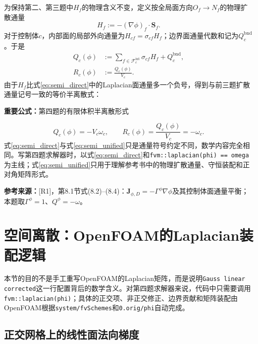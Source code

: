 \documentclass[UTF8,12pt,a4paper]{ctexart}
\numberwithin{equation}{section}
\newcommand{\Rone}{\textnormal{[R1]}}
\newcommand{\source}[1]{%
  \par\smallskip
  \noindent\colorbox{sourcebg}{%
    \parbox{0.955\linewidth}{\footnotesize\color{sourcegray}\textbf{参考来源：}#1}%
  }
  \par\smallskip
}
\newcommand{\keytitle}[1]{%
  \par\smallskip\noindent
  \colorbox{keybg}{\parbox{0.965\linewidth}{\color{keyblue}\textbf{重要公式：}#1}}
  \par\smallskip
}
\begin{document}
为保持第二、第三题中$H_f$的物理含义不变，定义按全局面方向$O_f\to N_f$的物理扩散通量
\begin{equation}
  \boxed{
  H_f:=-\left(\nabla\phi\right)_f\cdot\bm S_f.}
  \label{eq:H_definition}
\end{equation}
对于控制体$c$，内部面的局部外向通量为$H_{cf}=\sigma_{cf}H_f$；边界面通量代数和记为$Q_c^{\mathrm{bnd}}$。于是
\begin{align}
  Q_c(\phi)
  &:=%
  \sum_{f\in\mathcal F_c^{\mathrm{int}}}
  \sigma_{cf}H_f+Q_c^{\mathrm{bnd}},
  \label{eq:Q_definition}\\
  R_c(\phi)
  &:=\frac{Q_c(\phi)}{V_c}.
  \label{eq:R_definition}
\end{align}
由于$H_f$比式\eqref{eq:semi_direct}中的Laplacian面通量多一个负号，得到与前三题扩散通量记号一致的等价半离散式：
\keytitle{第四题的有限体积半离散形式}
\begin{equation}
  \boxed{
  Q_c(\phi)=-V_c\omega_c,
  \qquad
  R_c(\phi)=\frac{Q_c(\phi)}{V_c}=-\omega_c.}
  \label{eq:semi_unified}
\end{equation}
式\eqref{eq:semi_direct}与式\eqref{eq:semi_unified}只是通量符号约定不同，数学内容完全相同。写第四题求解器时，以式\eqref{eq:semi_direct}和\texttt{fvm::laplacian(phi) == omega}为主线；式\eqref{eq:semi_unified}只用于理解参考书中的物理扩散通量、守恒装配和正对角矩阵形式。

\source{\Rone，第8.1节式(8.2)--(8.4)：$\bm J_{\phi,D}=-\Gamma^\phi\nabla\phi$及其控制体面通量平衡；本题取$\Gamma^\phi=1$、$Q^\phi=-\omega$。}

\newpage
\section{空间离散：OpenFOAM的Laplacian装配逻辑}

本节的目的不是手工重写OpenFOAM的Laplacian矩阵，而是说明\texttt{Gauss linear corrected}这一行配置背后的数学含义。对第四题求解器来说，代码中只需要调用\texttt{fvm::laplacian(phi)}；具体的正交项、非正交修正、边界贡献和矩阵装配由OpenFOAM根据\texttt{system/fvSchemes}和\texttt{0.orig/phi}自动完成。

\subsection{正交网格上的线性面法向梯度}
\end{document}
